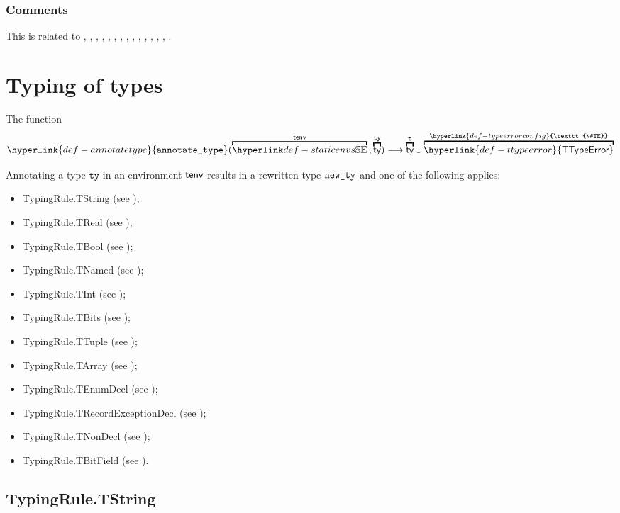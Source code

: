 \documentclass{book}
\newcommand\TTypeError[0]{\hyperlink{def-ttypeerror}{\textsf{TTypeError}}}
\newcommand\TypeErrorConfig[0]{\hyperlink{def-typeerrorconfig}{\texttt{\#TE}}}
\newcommand\annotatetype[1]{\hyperlink{def-annotatetype}{\texttt{annotate\_type}}(#1)}
\newcommand\vt[0]{\texttt{t}}
\newcommand\tty[0]{\texttt{ty}}
\begin{document}
\subsection{Comments}
  This is related to , , ,
  , , , , ,
  , , , , ,
  , .

\chapter{Typing of types}
\hypertarget{def-annotatetype}{}
The function
\[
  \annotatetype{\overname{\staticenvs}{\tenv} \aslsep \overname{\ty}{\tty}}
  \aslto \overname{\ty}{\vt} \cup \overname{\TTypeError}{\TypeErrorConfig}
\]

Annotating a type $\tty$ in an environment $\textsf{tenv}$ results in a
rewritten type $\texttt{new\_ty}$ and one of the following applies:
\begin{itemize}
  \item TypingRule.TString (see );
  \item TypingRule.TReal (see );
  \item TypingRule.TBool (see );
  \item TypingRule.TNamed (see );
  \item TypingRule.TInt (see );
  \item TypingRule.TBits (see );
  \item TypingRule.TTuple (see );
  \item TypingRule.TArray (see );
  \item TypingRule.TEnumDecl (see );
  \item TypingRule.TRecordExceptionDecl (see
    );
  \item TypingRule.TNonDecl (see );
  \item TypingRule.TBitField (see ).
\end{itemize}


\section{TypingRule.TString \label{sec:TypingRule.TString}}
\end{document}
